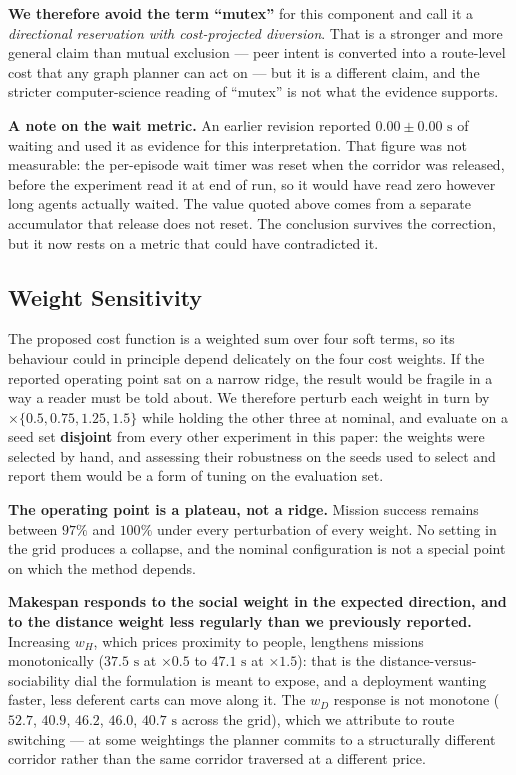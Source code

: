 \documentclass[journal]{IEEEtran}
\begin{document}
\textbf{We therefore avoid the term ``mutex''} for this component and call it a \emph{directional reservation with cost-projected diversion}. That is a stronger and more general claim than mutual exclusion --- peer intent is converted into a route-level cost that any graph planner can act on --- but it is a different claim, and the stricter computer-science reading of ``mutex'' is not what the evidence supports.

\textbf{A note on the wait metric.} An earlier revision reported $0.00 \pm 0.00\text{ s}$ of waiting and used it as evidence for this interpretation. That figure was not measurable: the per-episode wait timer was reset when the corridor was released, before the experiment read it at end of run, so it would have read zero however long agents actually waited. The value quoted above comes from a separate accumulator that release does not reset. The conclusion survives the correction, but it now rests on a metric that could have contradicted it.

\subsection{Weight Sensitivity}
\label{sec:sensitivity}
The proposed cost function is a weighted sum over four soft terms, so its behaviour could in principle
depend delicately on the four cost weights. If the reported operating point sat on a
narrow ridge, the result would be fragile in a way a reader must be told about. We
therefore perturb each weight in turn by $\times\{0.5, 0.75, 1.25, 1.5\}$ while
holding the other three at nominal, and evaluate on a seed set \textbf{disjoint} from
every other experiment in this paper: the weights were selected by hand, and
assessing their robustness on the seeds used to select and report them would be a
form of tuning on the evaluation set.



\textbf{The operating point is a plateau, not a ridge.} Mission success remains
between $97\%$ and $100\%$ under every perturbation of every weight. No setting in
the grid produces a collapse, and the nominal configuration is not a special point
on which the method depends.

\textbf{Makespan responds to the social weight in the expected direction, and to
the distance weight less regularly than we previously reported.} Increasing $w_H$,
which prices proximity to people, lengthens missions monotonically
($37.5\text{ s}$ at $\times0.5$ to $47.1\text{ s}$ at $\times1.5$): that is the
distance-versus-sociability dial the formulation is meant to expose, and a
deployment wanting faster, less deferent carts can move along it. The $w_D$
response is not monotone ($52.7$, $40.9$, $46.2$, $46.0$, $40.7\text{ s}$ across the
grid), which we attribute to route switching --- at some weightings the planner
commits to a structurally different corridor rather than the same corridor traversed
at a different price.
\end{document}
